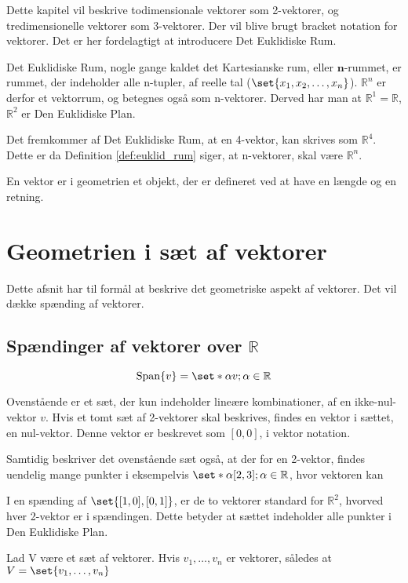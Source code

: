 Dette kapitel vil beskrive todimensionale vektorer som 2-vektorer, og tredimensionelle vektorer som 3-vektorer. Der vil blive brugt bracket notation for vektorer. Det er her fordelagtigt at introducere Det Euklidiske Rum.
\begin{frdef}\label{def:euklid_rum}
	Det Euklidiske Rum, nogle gange kaldet det Kartesianske rum, eller $\mathbf{n}$-rummet, er rummet, der indeholder alle n-tupler, af reelle tal ($\set{x_1,x_2,\dots,x_n}$). $\mathbb{R}^n$ er derfor et vektorrum, og betegnes også som n-vektorer. Derved har man at $\mathbb{R}^1=\mathbb{R}$, $\mathbb{R}^2$ er Den Euklidiske Plan.
\end{frdef}

Det fremkommer af Det Euklidiske Rum, at en 4-vektor, kan skrives som $\mathbb{R}^4$. Dette er da Definition \ref{def:euklid_rum} siger, at n-vektorer, skal være $\mathbb{R}^n$.

\begin{frdef}[Vektorer]
	En vektor er i geometrien et objekt, der er defineret ved at have en længde og en retning.
\end{frdef}

\section{Geometrien i sæt af vektorer}
Dette afsnit har til formål at beskrive det geometriske aspekt af vektorer. Det vil dække spænding af vektorer. 

\subsection{Spændinger af vektorer over $\mathbb{R}$}
 
\begin{equation}
	\mathrm{Span}\{v\}=\set*{\alpha v; \alpha\in\mathbb{R}}
\end{equation}

Ovenstående er et sæt, der kun indeholder lineære kombinationer, af en ikke-nul-vektor $v$.
Hvis et tomt sæt af 2-vektorer skal beskrives, findes en vektor i sættet, en nul-vektor. Denne vektor er beskrevet som $[0,0]$, i vektor notation.

Samtidig beskriver det ovenstående sæt også, at der for en 2-vektor, findes uendelig mange punkter i eksempelvis $\set*{\alpha[2,3]; \alpha\in\mathbb{R}}$, hvor vektoren kan 

I en spænding af $\set{[1,0],[0,1]}$, er de to vektorer standard for $\mathbb{R}^2$, hvorved hver 2-vektor er i spændingen. Dette betyder at sættet indeholder alle punkter i Den Euklidiske Plan.



\begin{frdef}
	Lad V være et sæt af vektorer. Hvis $v_1,\dots,v_n$ er vektorer, således at $V=\set{v_1,\dots,v_n}$
\end{frdef}